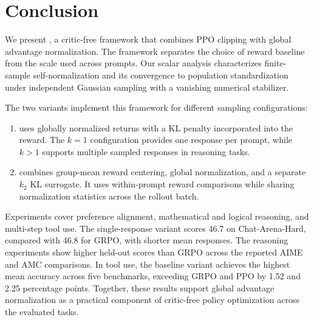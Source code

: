 \section{Conclusion}\label{sec:conclusion}
We present \ours, a critic-free framework that combines PPO clipping with global advantage normalization. The framework separates the choice of reward baseline from the scale used across prompts. Our scalar analysis characterizes finite-sample self-normalization and its convergence to population standardization under independent Gaussian sampling with a vanishing numerical stabilizer.

The two variants implement this framework for different sampling configurations:
\begin{enumerate}
    \item \ours uses globally normalized returns with a KL penalty incorporated into the reward. The $k=1$ configuration provides one response per prompt, while $k>1$ supports multiple sampled responses in reasoning tasks.
    \item \varn combines group-mean reward centering, global normalization, and a separate $k_2$ KL surrogate. It uses within-prompt reward comparisons while sharing normalization statistics across the rollout batch.
\end{enumerate}

Experiments cover preference alignment, mathematical and logical reasoning, and multi-step tool use. The single-response variant scores 46.7 on Chat-Arena-Hard, compared with 46.8 for GRPO, with shorter mean responses. The reasoning experiments show higher held-out scores than GRPO across the reported AIME and AMC comparisons. In tool use, the baseline variant achieves the highest mean accuracy across five benchmarks, exceeding GRPO and PPO by 1.52 and 2.25 percentage points. Together, these results support global advantage normalization as a practical component of critic-free policy optimization across the evaluated tasks.
